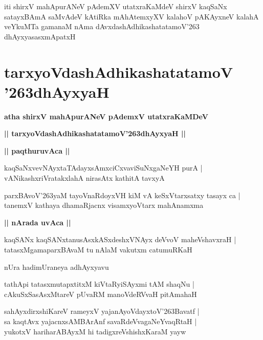 \documentclass[twoside,12pt,openright]{book}
\def\S{\char'263}
\newcounter{shloka}[chapter]
\def\uvaca#1{\centerline{{\large\textbf{#1}}}}
\begin{document}
\begin{center}
iti shirxV mahApurANeV pAdemXV utatxraKaMdeV shirxV kaqSaNx satayxBAmA saMvAdeV kAtiRka 
mAhAtemxyXV kalahoV pAKAyxneV kalahA veYkuMTa gamanaM nAma dAvxdashAdhikashatatamoV\S 
dhAyxyasasxmApatxH 
\end{center}

\chapter{tarxyoVdashAdhikashatatamoV \S dhAyxyaH}

\begin{center}
{\LARGE\bfseries atha shirxV mahApurANeV pAdemxV utatxraKaMDeV}
\end{center}

\begin{center}
{\LARGE\bfseries || tarxyoVdashAdhikashatatamoV\S dhAyxyaH || }
\end{center}

\uvaca{|| paqthuruvAca ||}

\begin{shloka}%
kaqSaNxvevNAyxtaTAdayxsAmxciCxvaviSuNxgaNeYH purA |\\
vANikashxriVratakxlahA nirasAtx kathitA tavxyA 
\end{shloka}

\begin{shloka}%
parxBAvoV\S yaM tayoVnaRdoyxVH kiM vA keSxVtarxsatxy tasayx ca |\\
tanemxV kathaya dhamaRjacnx visamxyoVtarx mahAnamxma
\end{shloka}

\uvaca{|| nArada uvAca ||}

\begin{shloka}%
kaqSANx kaqSANxtanusAsxkASxdeshxVNAyx deVvoV maheVshavxraH |\\
tatasxMgamaparxBAvaM tu nAlaM vakutxm catumuRKaH 
\end{shloka}

\begin{center}
nUra hadimUraneya adhAyxyavu
\end{center}

\begin{shloka}%
tathApi tatasxmutapxtitxM kiVtaRyiSAyxmi tAM shaqNu |\\
cAkuSxSasAsxMtareV pUvaRM manoVdeRVvaH pitAmahaH
\end{shloka}

\begin{shloka}%
sahAyxdirxshiKareV rameyxV yajanAyoVdayxtoV\S Bavatf |\\
sa kaqtAvx yajacnxsAMBArAnf savaRdeVvagaNeYvaqRtaH |\\
yukotxV hariharABAyxM hi tadigxreVshishxKaraM yayw 
\end{shloka}
\end{document}
